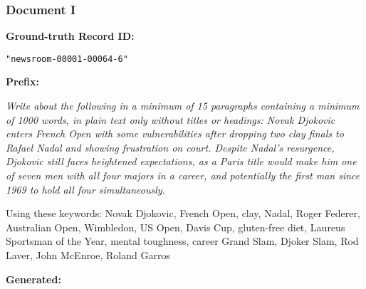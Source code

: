 \subsubsection{Document I}

{\bf\ttfamily Ground-truth Record ID:}
\begin{lstlisting}
"newsroom-00001-00064-6"
\end{lstlisting}

{\bf\ttfamily Prefix: }

{\ttfamily\em\footnotesize Write about the following in a minimum of 15 paragraphs containing a minimum of 1000 words, in plain text only without titles or headings: Novak Djokovic enters French Open with some vulnerabilities after dropping two clay finals to Rafael Nadal and showing frustration on court. Despite Nadal's resurgence, Djokovic still faces heightened expectations, as a Paris title would make him one of seven men with all four majors in a career, and potentially the first man since 1969 to hold all four simultaneously.

Using these keywords: Novak Djokovic, French Open, clay, Nadal, Roger Federer, Australian Open, Wimbledon, US Open, Davis Cup, gluten-free diet, Laureus Sportsman of the Year, mental toughness, career Grand Slam, Djoker Slam, Rod Laver, John McEnroe, Roland Garros
}

{\bf\ttfamily Generated: }

